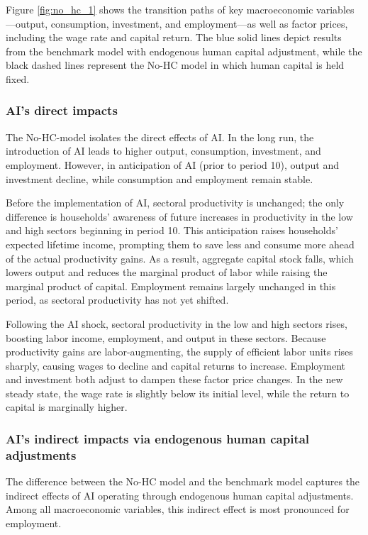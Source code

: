 \documentclass[12pt]{article}
\begin{document}
Figure \ref{fig:no_hc_1} shows the transition paths of key macroeconomic variables—output, consumption, investment, and employment—as well as factor prices, including the wage rate and capital return. The blue solid lines depict results from the benchmark model with endogenous human capital adjustment, while the black dashed lines represent the No-HC model in which human capital is held fixed.

\subsubsection{AI's direct impacts}

The No-HC-model isolates the direct effects of AI. In the long run, the introduction of AI leads to higher output, consumption, investment, and employment. However, in anticipation of AI (prior to period 10), output and investment decline, while consumption and employment remain stable.

Before the implementation of AI, sectoral productivity is unchanged; the only difference is households’ awareness of future increases in productivity in the low and high sectors beginning in period 10. This anticipation raises households’ expected lifetime income, prompting them to save less and consume more ahead of the actual productivity gains. As a result, aggregate capital stock falls, which lowers output and reduces the marginal product of labor while raising the marginal product of capital. Employment remains largely unchanged in this period, as sectoral productivity has not yet shifted.

Following the AI shock, sectoral productivity in the low and high sectors rises, boosting labor income, employment, and output in these sectors. Because productivity gains are labor-augmenting, the supply of efficient labor units rises sharply, causing wages to decline and capital returns to increase. Employment and investment both adjust to dampen these factor price changes. In the new steady state, the wage rate is slightly below its initial level, while the return to capital is marginally higher.

\subsubsection{AI's indirect impacts via endogenous human capital adjustments}

The difference between the No-HC model and the benchmark model captures the indirect effects of AI operating through endogenous human capital adjustments. Among all macroeconomic variables, this indirect effect is most pronounced for employment.
\end{document}
